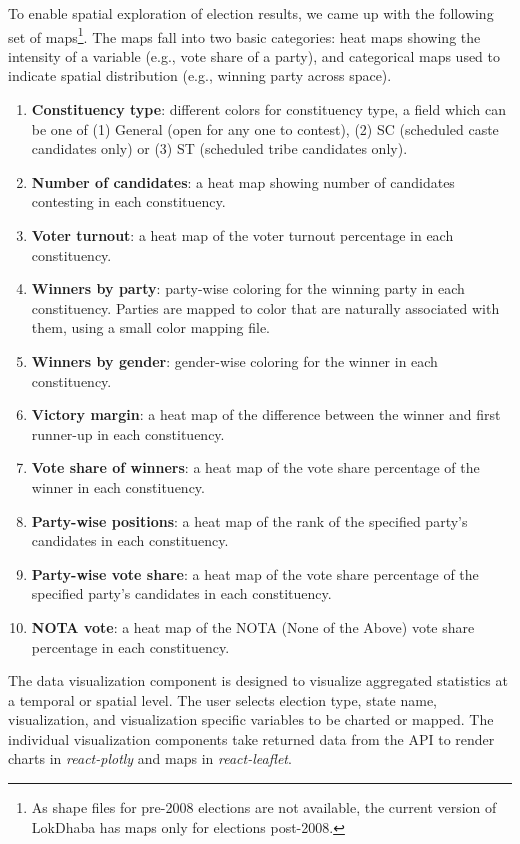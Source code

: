 To enable spatial exploration of election results, we came up with the following set of maps\footnote {As shape files for pre-2008 elections are not available, the current version of LokDhaba has maps only for elections post-2008.}. The maps fall into two basic categories: heat maps showing the intensity of a variable (e.g., vote share of a party), and categorical maps used to indicate spatial distribution (e.g., winning party across space).

\begin{enumerate}
    \item \textbf{Constituency type}: different colors for constituency type, a field which can be one of (1) General (open for any one to contest), (2) SC (scheduled caste candidates only) or (3) ST (scheduled tribe candidates only).
    \item \textbf{Number of candidates}: a heat map showing number of candidates contesting in each constituency.
    \item \textbf{Voter turnout}: a heat map of the voter turnout percentage in each constituency.
    \item \textbf{Winners by party}: party-wise coloring for the winning party in each constituency. Parties are mapped to color that are naturally associated with them, using a small color mapping file.
    \item \textbf{Winners by gender}: gender-wise coloring for the winner in each constituency.
    \item \textbf{Victory margin}: a heat map of the difference between the winner and first runner-up in each constituency.
    \item \textbf{Vote share of winners}: a heat map of the vote share percentage of the winner in each constituency.
    \item \textbf{Party-wise positions}: a heat map of the rank of the specified party's candidates in each constituency.
    \item \textbf{Party-wise vote share}: a heat map of the vote share percentage of the specified party's candidates in each constituency.
    \item \textbf{NOTA vote}: a heat map of the NOTA (None of the Above) vote share percentage in each constituency.
\end{enumerate}

  The data visualization component is designed to visualize aggregated statistics at a temporal or spatial level. The user selects election type, state name, visualization, and visualization specific variables to be charted or mapped. The individual visualization components take returned data from the API to render charts in \emph{react-plotly} and maps in \emph{react-leaflet}.
 

